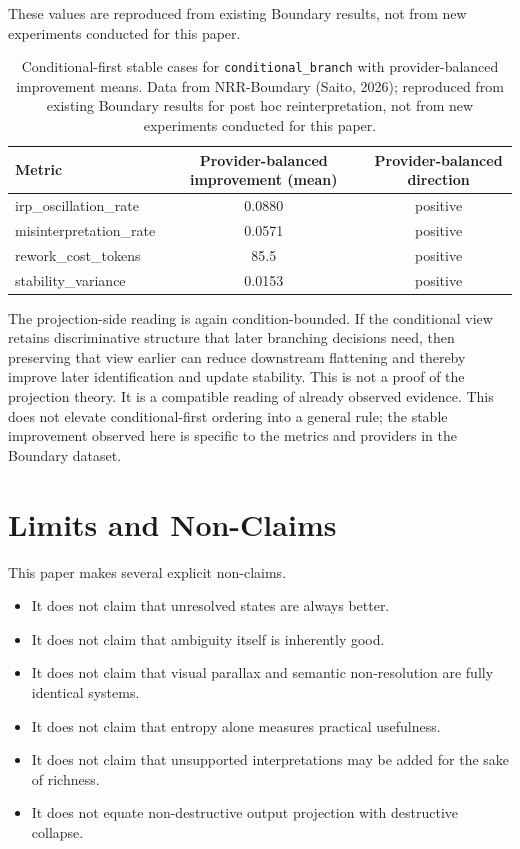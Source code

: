 \documentclass[11pt,a4paper]{article}
\begin{document}
These values are reproduced from existing Boundary results, not from new experiments conducted for this paper.

\begin{table}[h]
\centering
\small
\begin{tabular}{p{4.3cm}cc}
\toprule
Metric & Provider-balanced improvement (mean) & Provider-balanced direction \\
\midrule
irp\_oscillation\_rate & 0.0880 & positive \\
misinterpretation\_rate & 0.0571 & positive \\
rework\_cost\_tokens & 85.5 & positive \\
stability\_variance & 0.0153 & positive \\
\bottomrule
\end{tabular}
\caption{Conditional-first stable cases for \texttt{conditional\_branch} with provider-balanced improvement means. Data from NRR-Boundary (Saito, 2026); reproduced from existing Boundary results for post hoc reinterpretation, not from new experiments conducted for this paper.}
\label{tab:boundary_conditional_first}
\end{table}

The projection-side reading is again condition-bounded. If the conditional view retains discriminative structure that later branching decisions need, then preserving that view earlier can reduce downstream flattening and thereby improve later identification and update stability. This is not a proof of the projection theory. It is a compatible reading of already observed evidence.
This does not elevate conditional-first ordering into a general rule; the stable improvement observed here is specific to the metrics and providers in the Boundary dataset.

\section{Limits and Non-Claims}
\label{sec:limits}

This paper makes several explicit non-claims.

\begin{itemize}
  \item It does not claim that unresolved states are always better.
  \item It does not claim that ambiguity itself is inherently good.
  \item It does not claim that visual parallax and semantic non-resolution are fully identical systems.
  \item It does not claim that entropy alone measures practical usefulness.
  \item It does not claim that unsupported interpretations may be added for the sake of richness.
  \item It does not equate non-destructive output projection with destructive collapse.
\end{itemize}
\end{document}
